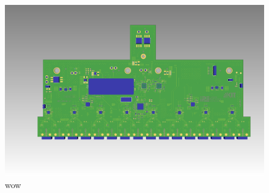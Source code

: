 \begin{figure}[H]
	\centering
	\includegraphics[width = \textwidth]{chap/05-conclusion/img/board_ugly}
	\caption{wow}
	\label{fig:board}
\end{figure}